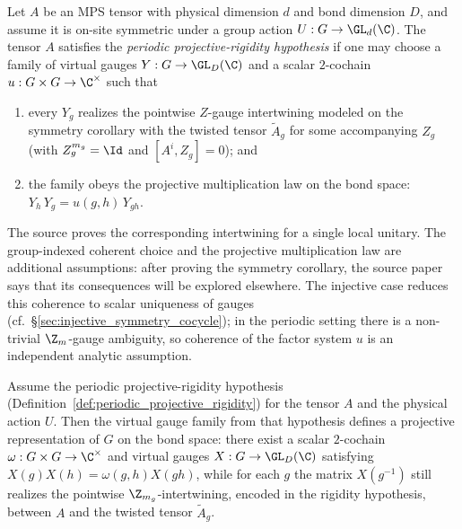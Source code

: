\begin{definition}%
    \label{def:periodic_projective_rigidity}
    \leanok
    Let $A$ be an MPS tensor with physical dimension $d$ and bond dimension $D$,
    and assume it is on-site symmetric under a group action
    $U : G \to \GL_d(\C)$. The tensor $A$ satisfies the
    \emph{periodic projective-rigidity hypothesis} if one may choose a
    family of virtual gauges $Y : G \to \GL_D(\C)$ and a scalar
    $2$-cochain $u : G \times G \to \C^{\times}$ such that

    \begin{enumerate}
        \item every $Y_g$ realizes the pointwise $Z$-gauge intertwining
              modeled on the symmetry corollary with the twisted tensor
              $\widetilde{A}_g$ for some accompanying
              $Z_g$ (with $Z_g^{m_g} = \Id$ and $[A^i, Z_g] = 0$); and
        \item the family obeys the projective multiplication law on the
              bond space: $Y_h\, Y_g = u(g, h)\, Y_{gh}$.
    \end{enumerate}

    The source proves the corresponding intertwining for a single local unitary.
    The group-indexed coherent choice and the projective multiplication law are
    additional assumptions: after proving the symmetry corollary, the source
    paper says that its consequences will be explored elsewhere. The injective
    case reduces this coherence to scalar uniqueness of gauges
    (cf.~\S\ref{sec:injective_symmetry_cocycle}); in the periodic
    setting there is a non-trivial $\Z_m$-gauge ambiguity, so coherence of the
    factor system $u$ is an independent analytic assumption.
\end{definition}

\begin{lemma}%
    \label{thm:cor_4_1_projective_rep}
    \leanok
    Assume the periodic projective-rigidity hypothesis
    (Definition~\ref{def:periodic_projective_rigidity}) for the tensor $A$ and
    the physical action $U$. Then the virtual gauge family from that
    hypothesis defines a projective representation of $G$ on the bond space:
    there exist a scalar $2$-cochain
    $\omega : G \times G \to \C^{\times}$ and virtual gauges
    $X : G \to \GL_D(\C)$ satisfying
    $X(g)X(h) = \omega(g,h)X(gh)$, while for each $g$ the matrix
    $X(g^{-1})$ still realizes the pointwise
    $\Z_{m_g}$-intertwining, encoded in the rigidity hypothesis, between $A$
    and the twisted tensor $\widetilde{A}_g$.
\end{lemma}

